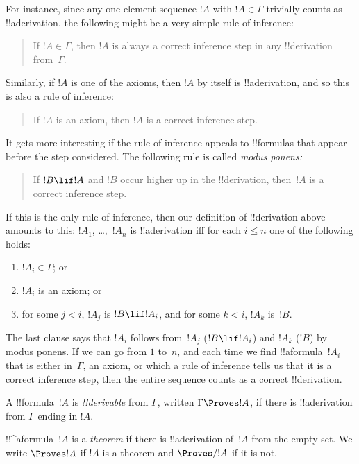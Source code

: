 For instance, since any one-element sequence $!A$ with $!A \in \Gamma$
trivially counts as !!a{derivation}, the following might be a very
simple rule of inference:
\begin{quote}
  If $!A \in \Gamma$, then $!A$ is always a correct inference step in
  any !!{derivation} from~$\Gamma$.
\end{quote}
Similarly, if $!A$ is one of the axioms, then $!A$ by itself is
!!a{derivation}, and so this is also a rule of inference:
\begin{quote}
  If $!A$ is an axiom, then $!A$ is a correct inference step.
\end{quote}
It gets more interesting if the rule of inference appeals to
!!{formula}s that appear before the step considered. The following
rule is called \emph{modus ponens:}
\begin{quote}
  If $!B \lif !A$ and $!B$ occur higher up in the !!{derivation},
  then~$!A$ is a correct inference step.
\end{quote}
If this is the only rule of inference, then our definition of
!!{derivation} above amounts to this: $!A_1$, \dots,~$!A_n$ is
!!a{derivation} iff for each $i \le n$ one of the following holds:
\begin{enumerate}
\item $!A_i \in \Gamma$; or
\item $!A_i$ is an axiom; or
\item for some $j < i$, $!A_j$ is $!B \lif !A_i$, and for some $k < i$,
  $!A_k$ is~$!B$.
\end{enumerate}
The last clause says that $!A_i$ follows from~$!A_j$ ($!B \lif !A_i$) and $!A_k$
($!B$) by modus ponens. If we can go from $1$ to~$n$, and
each time we find !!a{formula}~$!A_i$ that is either in~$\Gamma$, an
axiom, or which a rule of inference tells us that it is a correct
inference step, then the entire sequence counts as a correct
!!{derivation}.

\begin{defn}[!!^{derivability}]
A !!{formula}~$!A$ is \emph{!!{derivable}} from $\Gamma$, written
$\Gamma \Proves !A$, if there is !!a{derivation} from $\Gamma$ ending
in $!A$.
\end{defn}

\begin{defn}[Theorems]
!!^a{formula}~$!A$ is a \emph{theorem} if there is !!a{derivation}
of~$!A$ from the empty set.  We write $\Proves !A$ if $!A$ is a
theorem and $\Proves/ !A$ if it is not.
\end{defn}






